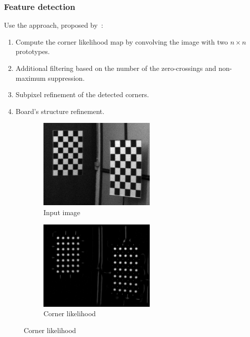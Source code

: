 \documentclass{beamer}
\begin{document}
\begin{frame}
	\frametitle{Feature detection}
	Use the approach, proposed by~\cite{geigerAutomaticCameraRange2012}:
	\begin{enumerate}
		\item Compute the corner likelihood map by convolving the image with two
		      \(n\times n\) prototypes.
		\item Additional filtering based on the number of the zero-crossings and
		      non-maximum suppression.
		\item Subpixel refinement of the detected corners.
		\item Board's structure refinement.
	\end{enumerate}
	\begin{figure}[h]
		\centering
		\begin{subfigure}{0.3\linewidth}
			\includegraphics[width=\textwidth]{10.png}
			\caption{Input image}
		\end{subfigure}
		\begin{subfigure}{0.3\linewidth}
			\includegraphics[width=\textwidth]{11.png}
			\caption{Corner likelihood}
		\end{subfigure}


\end{figure}
\end{frame}
\end{document}
